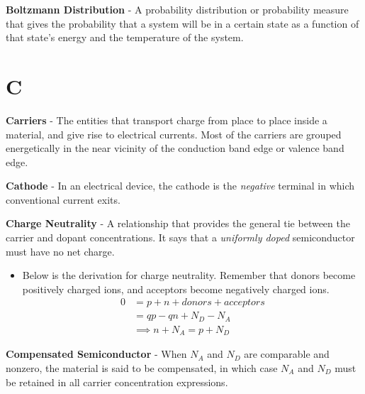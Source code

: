 \vspace{0.5cm}
    \textbf{Boltzmann Distribution} - A probability distribution or probability measure that gives the probability that a system will be in a certain state as a function of that state's energy and the temperature of the system. 
\section{C}
    \textbf{Carriers} - The entities that transport charge from place to place inside a material, and give rise to electrical currents.  Most of the carriers are grouped energetically in the near vicinity of the conduction band edge or valence band edge.

\vspace{0.5cm}
    \textbf{Cathode} - In an electrical device, the cathode is the \textit{negative} terminal in which conventional current exits.
    
\vspace{0.5cm}
\noindent
    \textbf{Charge Neutrality} - A relationship that provides the general tie between the carrier and dopant concentrations.  It says that a \emph{uniformly doped} semiconductor must have no net charge.
    \vspace{0.15cm}
    \begin{itemize}
        \setlength\itemsep{0.5em}
        \item Below is the derivation for charge neutrality.  Remember that donors become positively charged ions, and acceptors become negatively charged ions.
        {\begin{align*}
            0 &= p + n + donors + acceptors\\
            &= qp - qn + N_D - N_A\\
            &\implies \boxed{n + N_A = p + N_D}
        \end{align*}}
    \end{itemize}
\vspace{0.5cm}
    \textbf{Compensated Semiconductor} - When $N_A$ and $N_D$ are comparable and nonzero, the material is said to be compensated, in which case $N_A$ and $N_D$ must be retained in all carrier concentration expressions.

